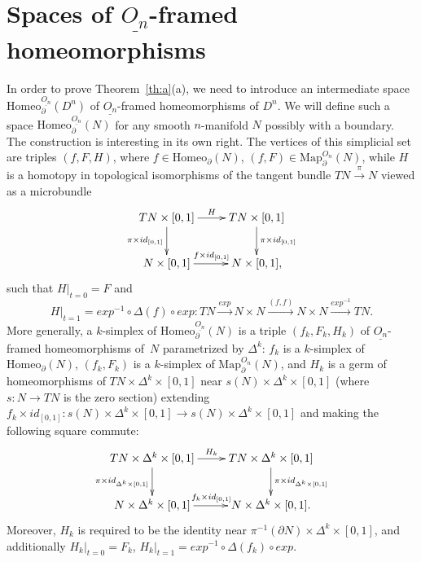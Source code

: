 \documentclass[11pt]{amsart}
\theoremstyle{definition}
\newcommand{\Map}{\mathrm{Map}}
\newcommand{\Homeo}{\mathrm{Homeo}}
\numberwithin{equation}{section}
\begin{document}
\section{Spaces of $\underline{O_n}$-framed homeomorphisms}\label{s:fr_homeo} %

In order to prove  Theorem~\ref{th:a}(a), we need to introduce an intermediate space $\Homeo_\partial^{\underline{O_n}}(D^n)$
of $\underline{O_n}$-framed homeomorphisms of $D^n$. We will define such a space  $\Homeo_\partial^{\underline{O_n}}(N)$ for any smooth $n$-manifold $N$
possibly with a boundary. The construction is interesting in its own right. The vertices of this simplicial set are triples $(f,F,H)$, where $f\in\Homeo_\partial(N)$,
$(f,F)\in\Map_\partial^{O_n}(N)$, while $H$ is a homotopy in topological isomorphisms of the tangent bundle $TN\xrightarrow{\pi}N$ viewed as a microbundle
\[
\xymatrix{
TN\times [0,1]\ar[r]^-H\ar[d]_{\pi\times id_{[0,1]}}&TN\times [0,1]\ar[d]^{\pi\times id_{[0,1]}}\\
N\times[0,1]\ar[r]^{f\times id_{[0,1]}}&N\times[0,1],
}
\]
such that $H|_{t=0}=F$ and $$H|_{t=1}=exp^{-1}\circ \Delta(f)\circ exp\colon TN\xrightarrow{exp}N\times N\xrightarrow{(f,f)}N\times N
\xrightarrow{exp^{-1}}TN.$$ More generally, a $k$-simplex of $\Homeo_\partial^{\underline{O_n}}(N)$ is a triple $(f_k,F_k,H_k)$ of  $\underline{O_n}$-framed homeomorphisms of~$N$ parametrized 
by $\Delta^k$: $f_k$ is a $k$-simplex of $\Homeo_\partial(N)$, $(f_k,F_k)$ is a $k$-simplex of 
$\Map_\partial^{O_n}(N)$, and $H_k$ is a germ of homeomorphisms of $TN\times \Delta^k\times [0,1]$ near $s(N)\times \Delta^k\times [0,1]$ (where $s\colon N\to TN$ is the zero section) extending $f_k\times id_{[0,1]}\colon s(N)\times\Delta^k\times [0,1]\to s(N)\times\Delta^k\times [0,1]$ and making the following square commute:
\[
\xymatrix{
TN\times\Delta^k \times[0,1]\ar[r]^-{H_k}\ar[d]_{\pi\times id_{\Delta^k\times [0,1]}}&TN\times\Delta^k\times [0,1]\ar[d]^{\pi\times id_{\Delta^k\times [0,1]}}\\
N\times\Delta^k\times[0,1]\ar[r]^{f_k\times id_{[0,1]}}&N\times\Delta^k\times[0,1].
}
\]
Moreover, $H_k$ is required to be the identity near $\pi^{-1}(\partial N)\times\Delta^k\times[0,1]$, and additionally $H_k|_{t=0}=F_k$, $H_k|_{t=1}=
exp^{-1}\circ \Delta(f_k)\circ exp$.
\end{document}

